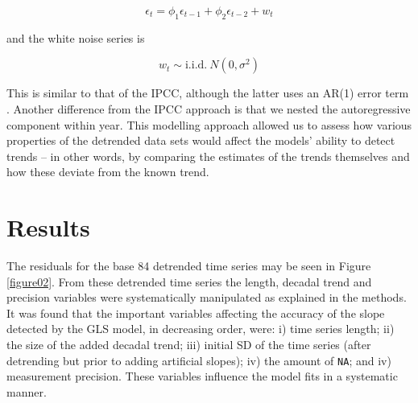 \documentclass[]{ametsoc}
\begin{document}
$$\epsilon_{t} = \phi_{1}\epsilon_{t-1} + \phi_{2}\epsilon_{t-2} + w_{t}$$

and the white noise series is

$$w_{t} \sim \mathrm{i.i.d.}~N(0,\sigma^{2})$$

This is similar to that of the IPCC, although the latter uses an AR(1) error term \citep{IPCC2013supp}. Another difference from the IPCC approach is that we nested the autoregressive component within year. This modelling approach allowed us to assess how various properties of the detrended data sets would affect the models' ability to detect trends -- in other words, by comparing the estimates of the trends themselves and how these deviate from the known trend.

\section{Results}
The residuals for the base 84 detrended time series may be seen in Figure \ref{figure02}. From these detrended time series the length, decadal trend and precision variables were systematically manipulated as explained in the methods. It was found that the important variables affecting the accuracy of the slope detected by the GLS model, in decreasing order, were: i) time series length; ii) the size of the added decadal trend; iii) initial SD of the time series (after detrending but prior to adding artificial slopes); iv) the amount of \texttt{NA}; and iv) measurement precision. These variables influence the model fits in a systematic manner.
\end{document}
